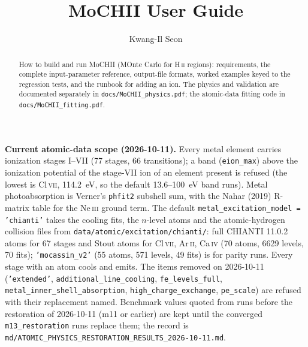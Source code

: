 \documentclass[english,a4paper]{my_memo}
\newcommand{\code}[1]{\texttt{#1}}
\begin{document}
\title{MoCHII User Guide}
\author{Kwang-Il Seon}
\date{\docmoddate}
\maketitle

\begin{abstract}
How to build and run MoCHII (MOnte Carlo for H\,\textsc{ii} regions):
requirements, the complete input-parameter reference, output-file
formats, worked examples keyed to the regression tests, and the runbook
for adding an ion.  The physics and validation are documented separately
in \code{docs/MoCHII\_physics.pdf}; the atomic-data fitting code
in \code{docs/MoCHII\_fitting.pdf}.
\end{abstract}

\noindent\textbf{Current atomic-data scope (2026-10-11).}
Every metal element carries ionization stages I--VII (77 stages, 66
transitions); a band (\code{eion\_max}) above the ionization potential of
the stage-VII ion of an element present is refused (the lowest is
Cl\,\textsc{vii}, 114.2~eV, so the default 13.6--100~eV band runs).  Metal
photoabsorption is Verner's \code{phfit2} subshell sum, with the Nahar
(2019) R-matrix table for the Ne\,\textsc{iii} ground term.  The default
\code{metal\_excitation\_model = 'chianti'} takes the cooling fits, the
$n$-level atoms and the atomic-hydrogen collision files from
\code{data/atomic/excitation/chianti/}: full CHIANTI 11.0.2 atoms for 67
stages and Stout atoms for Cl\,\textsc{vii}, Ar\,\textsc{ii},
Ca\,\textsc{iv} (70 atoms, 6629 levels, 70 fits); \code{'mocassin\_v2'}
(55 atoms, 571 levels, 49 fits) is for parity runs.  Every stage with an
atom cools and emits.  The items removed on 2026-10-11 (\code{'extended'},
\code{additional\_line\_cooling}, \code{fe\_levels\_full},
\code{metal\_inner\_shell\_absorption}, \code{high\_charge\_exchange},
\code{pe\_scale}) are refused with their replacement named.  Benchmark
values quoted from runs before the restoration of 2026-10-11 (m11 or
earlier) are kept until the converged \code{m13\_restoration} runs replace
them; the record is
\code{md/ATOMIC\_PHYSICS\_RESTORATION\_RESULTS\_2026-10-11.md}.

\tableofcontents

\end{document}
